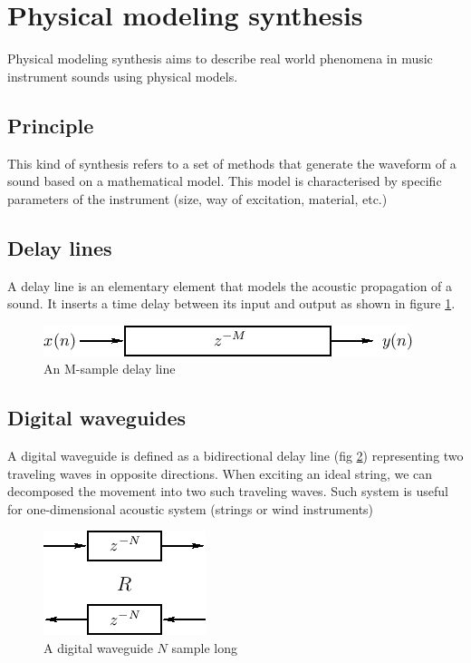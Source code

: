 \documentclass[11pt,a4paper]{article}
\begin{document}
\section{Physical modeling synthesis}

Physical modeling synthesis aims to describe real world phenomena in music instrument sounds using physical models.\cite{pasp}

\subsection*{Principle}
This kind of synthesis refers to a set of methods that generate the waveform of a sound based on a mathematical model. This model is characterised by specific parameters of the instrument (size, way of excitation, material, etc.)

\subsection*{Delay lines}
A delay line is an elementary element that models the acoustic propagation of a sound. It inserts a time delay between its input and output as shown in figure \ref{fig:delayline}.
\begin{figure}[h]
	\centering
	\includegraphics[scale=0.5]{Pictures/delayline.png}
	\caption{An M-sample delay line}
	\label{fig:delayline}
\end{figure}

\subsection*{Digital waveguides}
A digital waveguide is defined as a bidirectional delay line (fig \ref{fig:waveguide}) representing two traveling waves in opposite directions. When exciting an ideal string, we can decomposed the movement into two such traveling waves. Such system is useful for one-dimensional acoustic system (strings or wind instruments)
\begin{figure}
	\centering
	\includegraphics[scale=0.5]{Pictures/waveguide.png}
	\caption{A digital waveguide $N$ sample long}
	\label{fig:waveguide}
\end{figure}
\end{document}
